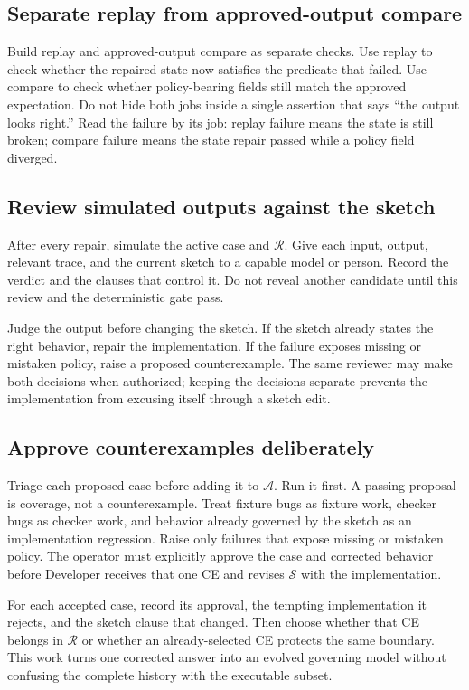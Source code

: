 \documentclass[11pt]{article}
\newcommand{\sketch}{\mathcal{S}}
\newcommand{\archive}{\mathcal{A}}
\newcommand{\regression}{\mathcal{R}}
\begin{document}
\subsection{Separate replay from approved-output compare}

Build replay and approved-output compare as separate checks.  Use replay to check whether the repaired state
now satisfies the predicate that failed.  Use compare to check whether policy-bearing fields
still match the approved expectation.  Do not hide both jobs inside a single assertion that
says ``the output looks right.''  Read the failure by its job: replay failure means the state
is still broken; compare failure means the state repair passed while a policy field diverged.

\subsection{Review simulated outputs against the sketch}

After every repair, simulate the active case and $\regression$.  Give each input, output,
relevant trace, and the current sketch to a capable model or person.  Record the verdict and the
clauses that control it.  Do not reveal another candidate until this review and the deterministic
gate pass.

Judge the output before changing the sketch.  If the sketch already states the right behavior,
repair the implementation.  If the failure exposes missing or mistaken policy, raise a proposed
counterexample.  The same reviewer may make both decisions when authorized; keeping the
decisions separate prevents the implementation from excusing itself through a sketch edit.

\subsection{Approve counterexamples deliberately}

Triage each proposed case before adding it to $\archive$.  Run it first.  A passing proposal is
coverage, not a counterexample.  Treat fixture bugs as fixture work, checker bugs as checker work,
and behavior already governed by the sketch as an implementation regression.  Raise only
failures that expose missing or mistaken policy.  The operator must explicitly approve the case
and corrected behavior before Developer receives that one CE and revises $\sketch$ with the
implementation.

For each accepted case, record its approval, the tempting implementation it rejects, and the
sketch clause that changed.  Then choose whether that CE belongs in $\regression$ or whether an
already-selected CE protects the same boundary.  This work turns one corrected answer into an
evolved governing model without confusing the complete history with the executable subset.
\end{document}
